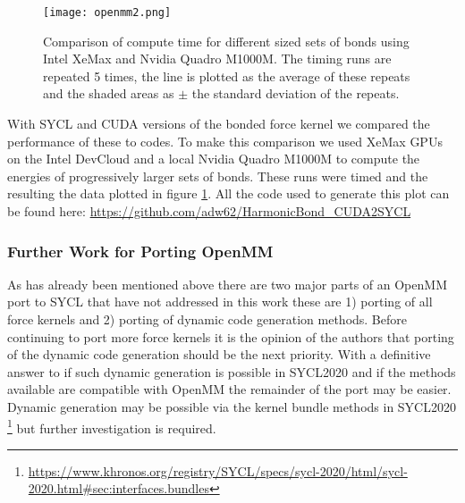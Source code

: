 \begin{figure}
	\caption{Comparison of compute time for different sized sets of bonds using Intel XeMax and Nvidia Quadro M1000M. The timing runs are repeated 5 times, the line is plotted as the average of these repeats and the shaded areas as $\pm$ the standard deviation of the repeats.}
	\texttt{[image: openmm2.png]}
	\label{fig:openmm}
\end{figure}

With SYCL and CUDA versions of the bonded force kernel we compared the performance of these to codes.
To make this comparison we used XeMax GPUs on the Intel DevCloud and a local Nvidia Quadro M1000M to compute the energies of progressively larger sets of bonds.
These runs were timed and the resulting the data plotted in figure \ref{fig:openmm}.
All the code used to generate this plot can be found here: \url{https://github.com/adw62/HarmonicBond_CUDA2SYCL}

\subsubsection{Further Work for Porting OpenMM}\label{sec:openmm_furtherwork}

As has already been mentioned above there are two major parts of an OpenMM port to SYCL that have not addressed in this work these are 1) porting of all force kernels and 2) porting of dynamic code generation methods.
Before continuing to port more force kernels it is the opinion of the authors that porting of the dynamic code generation should be the next priority.
With a definitive answer to if such dynamic generation is possible in SYCL2020 and if the methods available are compatible with OpenMM the remainder of the port may be easier.
Dynamic generation may be possible via the kernel bundle methods in SYCL2020 \footnote{\url{https://www.khronos.org/registry/SYCL/specs/sycl-2020/html/sycl-2020.html\#sec:interfaces.bundles}} but further investigation is required.
